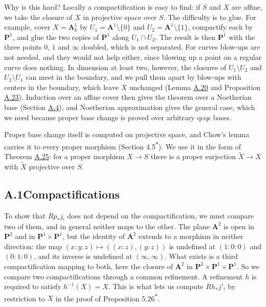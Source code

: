 \documentclass[11pt]{article}
\newcommand{\bpout}[1]{#1\textsuperscript{\hyperlink{bp-outside}{\ensuremath{\ast}}}}
\begin{document}
Why is this hard? Locally a compactification is easy to find: if \(S\) and \(X\) are affine, we take the closure of \(X\) in projective space over \(S\). The difficulty is to glue. For example, cover \(X=\mathbf A^1_k\) by \(U_1=\mathbf A^1\setminus\{0\}\) and \(U_2=\mathbf A^1\setminus\{1\}\), compactify each by \(\mathbf P^1\), and glue the two copies of \(\mathbf
P^1\) along \(U_1\cap U_2\). The result is then \(\mathbf P^1\) with the three points \(0\), \(1\) and \(\infty\) doubled, which is not separated. For curves blow-ups are not needed, and they would not help either, since blowing up a point on a regular curve does nothing. In dimension at least two, however, the closures of \(U_1\setminus U_2\) and \(U_2\setminus U_1\) can meet in the boundary, and we pull them apart by blow-ups with centers in the boundary, which leave \(X\) unchanged (Lemma \hyperref[bp53]{A.20} and Proposition \hyperref[bp61]{A.23}). Induction over an affine cover then gives the theorem over a Noetherian base (Section \hyperref[bp63]{A.4}), and Noetherian approximation gives the general case, which we need because proper base change is proved over arbitrary qcqs bases.

Proper base change itself is computed on projective space, and Chow's lemma carries it to every proper morphism (Section \bpout{4.5}). We use it in the form of Theorem \hyperref[bp71]{A.25}: for a proper morphism \(X\to S\) there is a proper surjection \(\widetilde X\to X\) with \(\widetilde X\) projective over \(S\).

\subsection*{\texorpdfstring{A.1\quad Compactifications}{A.1 Compactifications}}
\label{bp3}%
\label{bp4}%
To show that \(Rp_*j_!\) does not depend on the compactification, we must compare two of them, and in general neither maps to the other. The plane \(\mathbf A^2\) is open in \(\mathbf P^2\) and in \(\mathbf P^1\times\mathbf P^1\), but the identity of \(\mathbf A^2\) extends to a morphism in neither direction: the map \((x:y:z)\mapsto((x:z),(y:z))\) is undefined at \((1:0:0)\) and \((0:1:0)\), and its inverse is undefined at \((\infty,\infty)\). What exists is a third compactification mapping to both, here the closure of \(\mathbf A^2\) in \(\mathbf P^2\times\mathbf P^1\times\mathbf P^1\). So we compare two compactifications through a common refinement. A refinement \(h\) is required to satisfy \(h^{-1}(X)=X\). This is what lets us compute \(Rh_*j'_!\) by restriction to \(X\) in the proof of Proposition \bpout{5.26}.
\end{document}

